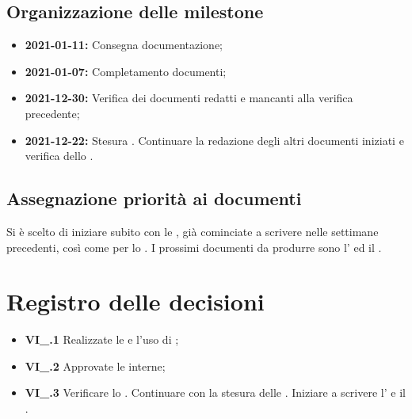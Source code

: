 \subsection{Organizzazione delle milestone}
 \begin{itemize}
  \item \textbf{2021-01-11:} Consegna documentazione;
  \item \textbf{2021-01-07:} Completamento documenti;
  \item \textbf{2021-12-30:} Verifica dei documenti redatti e mancanti alla verifica precedente;
  \item \textbf{2021-12-22:} Stesura \textit{\PdP}. Continuare la redazione degli altri documenti iniziati e verifica dello \textit{\SdF}.
 \end{itemize}

\subsection{Assegnazione priorità ai documenti}
Si è scelto di iniziare subito con le \textit{\NdP}, già cominciate a scrivere nelle settimane precedenti, così come per lo \textit{\SdF}. I prossimi documenti da produrre sono l'\textit{\AdR} ed il \textit{\PdP}. 

\section{Registro delle decisioni}
\begin{itemize}
  \item \textbf{VI\_\Data.1} Realizzate le   e l'uso di ;
  \item \textbf{VI\_\Data.2} Approvate le  interne;
  \item \textbf{VI\_\Data.3} Verificare lo {\SdF}. Continuare con la stesura delle {\NdP}. Iniziare a scrivere l'{\AdR} e il \PdP.
\end{itemize}




